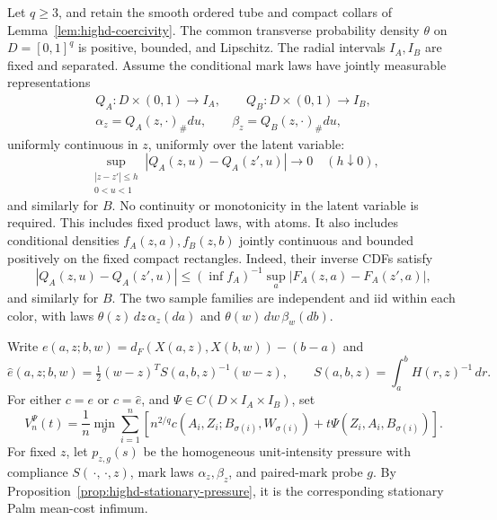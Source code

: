 \documentclass[11pt,reqno]{amsart}
\theoremstyle{definition}
\theoremstyle{remark}
\numberwithin{equation}{section}
\begin{document}
Let \(q\ge3\), and retain the smooth ordered tube and compact collars
of Lemma~\ref{lem:highd-coercivity}. The common transverse probability
density \(\theta\) on \(D=[0,1]^q\) is positive, bounded, and Lipschitz.
The radial intervals \(I_A,I_B\) are fixed and separated. Assume the
conditional mark laws have jointly measurable representations
\begin{equation}
\label{eq:highd-conditional-representations}
 \begin{gathered}
 Q_A:D\times(0,1)\longrightarrow I_A,\qquad
 Q_B:D\times(0,1)\longrightarrow I_B,\\
 \alpha_z=Q_A(z,\cdot)_\#du,\qquad
 \beta_z=Q_B(z,\cdot)_\#du,
 \end{gathered}
\end{equation}
uniformly continuous in \(z\), uniformly over the latent variable:
\[
 \sup_{\substack{|z-z'|\le h\\0<u<1}}
       |Q_A(z,u)-Q_A(z',u)|\longrightarrow0
 \quad(h\downarrow0),
\]
and similarly for \(B\). No continuity or monotonicity in the latent
variable is required. This includes fixed product laws, with atoms.
It also includes conditional densities \(f_A(z,a),f_B(z,b)\) jointly
continuous and bounded positively on the fixed compact rectangles.
Indeed, their inverse CDFs satisfy
\[
 |Q_A(z,u)-Q_A(z',u)|
 \le(\inf f_A)^{-1}\sup_a|F_A(z,a)-F_A(z',a)|,
\]
and similarly for \(B\). The two
sample families are independent and iid within each color, with laws
\(\theta(z)\,dz\,\alpha_z(da)\) and
\(\theta(w)\,dw\,\beta_w(db)\).

Write \(e(a,z;b,w)=d_F(X(a,z),X(b,w))-(b-a)\) and
\[
 \widehat e(a,z;b,w)=\tfrac12(w-z)^TS(a,b,z)^{-1}(w-z),
 \qquad S(a,b,z)=\int_a^b H(r,z)^{-1}\,dr.
\]
For either \(c=e\) or \(c=\widehat e\), and
\(\Psi\in C(D\times I_A\times I_B)\), set
\begin{equation}
\label{eq:highd-variable-finite-pressure}
 V_n^\Psi(t)=\frac1n\min_\sigma\sum_{i=1}^n
 \left[n^{2/q}c(A_i,Z_i;B_{\sigma(i)},W_{\sigma(i)})
             +t\Psi(Z_i,A_i,B_{\sigma(i)})\right].
\end{equation}
For fixed \(z\), let \(p_{z,g}(s)\) be the homogeneous unit-intensity
pressure with compliance \(S(\,\cdot,\,\cdot,z)\), mark laws
\(\alpha_z,\beta_z\), and paired-mark probe \(g\). By
Proposition~\ref{prop:highd-stationary-pressure}, it is the corresponding
stationary Palm mean-cost infimum.
\end{document}

